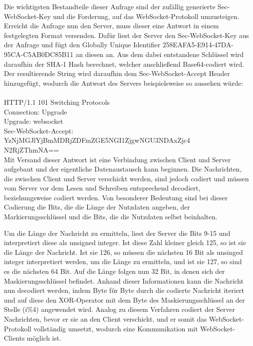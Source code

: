\documentclass[12pt, onecolumn,notitlepage]{scrartcl}
\begin{document}
Die wichtigsten Bestandteile dieser Anfrage sind der zufällig generierte Sec-WebSocket-Key und die Forderung, auf das WebSocket-Protokoll umzusteigen. Erreicht die Anfrage nun den Server, muss dieser eine Antwort in einem festgelegten Format versenden. Dafür liest der Server den Sec-WebSocket-Key aus der Anfrage und fügt den Globally Unique Identifier 258EAFA5-E914-47DA-95CA-C5AB0DC85B11 an diesen an. Aus dem dabei entstandene Schlüssel wird daraufhin der SHA-1 Hash berechnet, welcher anschließend Base64-codiert wird.  Der resultierende String wird daraufhin dem Sec-WebSocket-Accept Header hinzugefügt, wodurch die Antwort des Servers beispielsweise so aussehen würde: \\ \\
HTTP/1.1 101 Switching Protocols \\
Connection: Upgrade \\
Upgrade: websocket \\
Sec-WebSocket-Accept: YzNjMGJlYjBmMDRjZDFmZGE5NGI1ZjgwNGU3NDAxZjc4\\N2RjZThmNA== \\

Mit Versand dieser Antwort ist eine Verbindung zwischen Client und Server aufgebaut und der eigentliche Datenaustausch kann beginnen. Die Nachrichten, die zwischen Client und Server verschickt werden, sind jedoch codiert und müssen vom Server vor dem Lesen und Schreiben entsprechend decodiert, beziehungsweise codiert werden. Von besonderer Bedeutung sind bei dieser Codierung die Bits, die die Länge der Nutzdaten angeben, der Markierungsschlüssel und die Bits, die die Nutzdaten selbst beinhalten. \par
Um die Länge der Nachricht zu ermitteln, liest der Server die Bits 9-15 und interpretiert diese als unsigned integer. Ist diese Zahl kleiner gleich 125, so ist sie die Länge der Nachricht. Ist sie 126, so müssen die nächsten 16 Bit als unsinged integer interpretiert werden, um die Länge zu ermitteln, und ist sie 127, so sind es die nächsten 64 Bit. Auf die Länge folgen nun 32 Bit, in denen sich der Maskierungsschlüssel befindet. Anhand dieser Informationen kann die Nachricht nun decodiert werden, indem Byte für Byte durch die codierte Nachricht iteriert und auf diese den XOR-Operator mit dem  Byte des Maskierungsschlüssel an der Stelle (i\%4) angewendet wird.  Analog zu diesem Verfahren codiert der Server Nachrichten, bevor er sie an den Client verschickt, und er somit das WebSocket-Protokoll vollständig umsetzt, wodurch eine Kommunikation mit WebSocket-Clients möglich ist.\\
\end{document}
